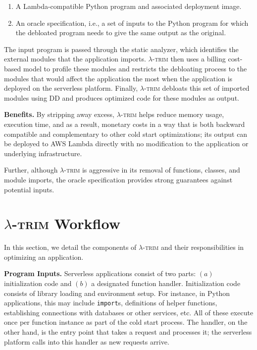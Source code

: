 \documentclass[sigplan,screen]{acmart}
\newenvironment{vinenum}
{\begin{enumerate}[leftmargin=2.5em]
  \setlength{\itemsep}{0pt}
  \setlength{\labelwidth}{1em}
\setlength{\parsep}{0pt}
\setlength{\topsep}{0pt}
  \setlength{\partopsep}{0px}
  }
{\end{enumerate}}
\newcommand{\sys}{\textsc{\ensuremath{\lambda}-trim}\xspace}
\newcommand{\heading}[1]{\vspace{4pt}\noindent\textbf{#1.}}
\begin{document}
\begin{vinenum}
    \item A Lambda-compatible Python program and associated deployment image.
    \item An oracle specification, i.e., a set of inputs to the Python program for which the debloated program needs to give the same output as the original.
\end{vinenum}

The input program is passed through the static analyzer, which identifies the external modules that the application imports.
\sys then uses a billing cost-based model to profile these modules and restricts the debloating process to the modules that would affect the application the most when the application is deployed on the serverless platform.
Finally, \sys debloats this set of imported modules using DD and produces optimized code for these modules as output.


\heading{Benefits}
By stripping away excess, \sys helps reduce memory usage, execution time, and as a result, monetary costs in a way that is both backward compatible and complementary to other cold start optimizations;
its output can be deployed to AWS Lambda directly with no modification to the application or underlying infrastructure.


Further, although \sys is aggressive in its removal of functions, classes, and module imports, the oracle specification provides strong guarantees against potential inputs.

















\section{\texorpdfstring{\boldmath}{}\sys Workflow}

In this section, we detail the components of \sys and their responsibilities in optimizing an application.

\heading{Program Inputs}
Serverless applications consist of two parts: $(a)$ initialization code and $(b)$ a designated function handler.
Initialization code consists of library loading and environment setup.
For instance, in Python applications, this may include \texttt{import}s, definitions of helper functions, establishing connections with databases or other services, etc.
All of these execute once per function instance as part of the cold start process.
The handler, on the other hand, is the entry point that takes a request and processes it;
the serverless platform calls into this handler as new requests arrive.
\end{document}
